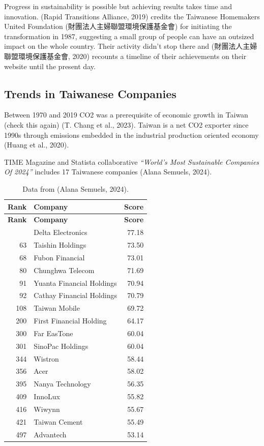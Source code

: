 \documentclass[
  letterpaper,
  DIV=11,
  numbers=noendperiod]{scrartcl}
\begin{document}
Progress in sustainability is possible but achieving results takes time
and innovation. (Rapid Transitions Alliance, 2019) credits the Taiwanese
Homemakers United Foundation (財團法人主婦聯盟環境保護基金會) for
initiating the transformation in 1987, suggesting a small group of
people can have an outsized impact on the whole country. Their activity
didn't stop there and (財團法人主婦聯盟環境保護基金會, 2020) recounts a
timeline of their achievements on their website until the present day.

\subsection{Trends in Taiwanese
Companies}\label{trends-in-taiwanese-companies}

Between 1970 and 2019 CO2 was a prerequisite of economic growth in
Taiwan (check this again) (T. Chang et al., 2023). Taiwan is a net CO2
exporter since 1990s through emissions embedded in the industrial
production oriented economy (Huang et al., 2020).

TIME Magazine and Statista collaborative \emph{``World's Most
Sustainable Companies Of 2024''} includes 17 Taiwanese companies (Alana
Semuels, 2024).

\begin{longtable}[]{@{}rlr@{}}
\caption{Data from (Alana Semuels, 2024).}\tabularnewline
\toprule\noalign{}
\textbf{Rank} & \textbf{Company} & \textbf{Score} \\
\midrule\noalign{}
\endfirsthead
\toprule\noalign{}
\textbf{Rank} & \textbf{Company} & \textbf{Score} \\
\midrule\noalign{}
\endhead
\bottomrule\noalign{}
\endlastfoot
24 & Delta Electronics & 77.18 \\
63 & Taishin Holdings & 73.50 \\
68 & Fubon Financial & 73.01 \\
80 & Chunghwa Telecom & 71.69 \\
91 & Yuanta Financial Holdings & 70.94 \\
92 & Cathay Financial Holdings & 70.79 \\
108 & Taiwan Mobile & 69.72 \\
200 & First Financial Holding & 64.17 \\
300 & Far EasTone & 60.04 \\
301 & SinoPac Holdings & 60.04 \\
344 & Wistron & 58.44 \\
356 & Acer & 58.02 \\
395 & Nanya Technology & 56.35 \\
409 & InnoLux & 55.82 \\
416 & Wiwynn & 55.67 \\
421 & Taiwan Cement & 55.49 \\
497 & Advantech & 53.14 \\
\end{longtable}
\end{document}
